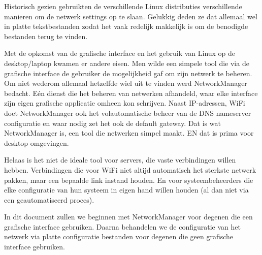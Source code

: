 Historisch gezien gebruikten de verschillende Linux distributies verschillende manieren om de netwerk settings op te slaan. Gelukkig deden ze dat allemaal wel in platte tekstbestanden zodat het vaak redelijk makkelijk is om de benodigde bestanden terug te vinden.

Met de opkomst van de grafische interface en het gebruik van Linux op de desktop/laptop kwamen er andere eisen. Men wilde een simpele tool die via de grafische interface de gebruiker de mogelijkheid gaf om zijn netwerk te beheren. Om niet wederom allemaal hetzelfde wiel uit te vinden werd NetworkManager bedacht. E\'en dienst die het beheren van netwerken afhandeld, waar elke interface zijn eigen grafische applicatie omheen kon schrijven. Naast IP-adressen, WiFi doet NetworkManager ook het volautomatische beheer van de DNS nameserver configuratie en waar nodig zet het ook de default gateway. Dat is wat NetworkManager is, een tool die netwerken simpel maakt. EN dat is prima voor desktop omgevingen.

Helaas is het niet de ideale tool voor servers, die vaste verbindingen willen hebben. Verbindingen die voor WiFi niet altijd automatisch het sterkste netwerk pakken, maar een bepaalde link instand houden. En voor systeembeheerders die elke configuratie van hun systeem in eigen hand willen houden (al dan niet via een geautomatiseerd proces).

In dit document zullen we beginnen met NetworkManager voor degenen die een grafische interface gebruiken. Daarna behandelen we de configuratie van het netwerk via platte configuratie bestanden voor degenen die geen grafische interface gebruiken.

